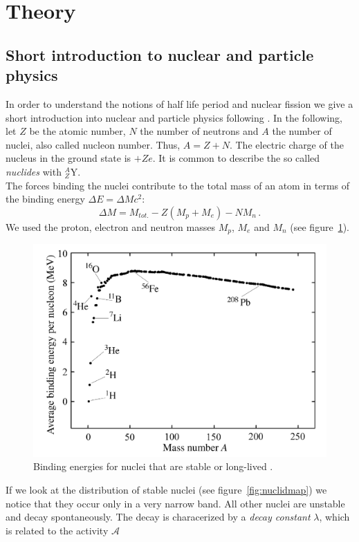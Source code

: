 \section{Theory}
\subsection{Short introduction to nuclear and particle physics}
In order to understand the notions of half life period and nuclear fission we
give a short introduction into nuclear and particle physics following \cite{Hooshyar}.
In the following, let $Z$ be the atomic number, $N$ the number of neutrons and $A$ the number of nuclei, also
called nucleon number. Thus, $A = Z + N$. The electric charge of the nucleus in the ground state is $+Z e$.
It is common to describe the so called \emph{nuclides} with $_{Z}^{A}\textrm{Y}$.\\
The forces binding the nuclei contribute to the total mass of an atom in terms of the 
binding energy $\Delta E = \Delta M c^2$:
\begin{equation}
\Delta M = M_{tot.} - Z(M_p + M_e) - N M_n \, .
\end{equation}
We used the proton, electron and neutron masses $M_p$, $M_e$ and $M_n$ 
(see figure~\ref{fig:bindingenergy}).
\begin{figure}[htpb]
    \centering
    \includegraphics[width=0.8\linewidth]{figures/bindingenergy}
    \caption{Binding energies for nuclei that are stable or long-lived \cite{Hooshyar}.}
    \label{fig:bindingenergy}
\end{figure}
If we look at the distribution of stable nuclei (see figure~\ref{fig:nuclidmap}) we notice
that they occur only in a very narrow band. All other nuclei are unstable and decay spontaneously.
The decay is characerized by a \emph{decay constant} $\lambda$, which is related to the activity $\mathcal{A}$
